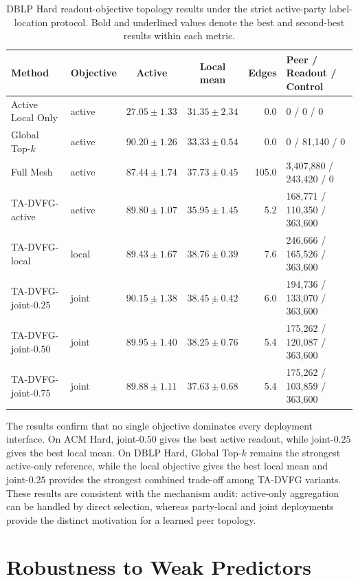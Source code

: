 \documentclass[letterpaper]{article}
\newcommand{\method}{\textsc{TA-DVFG}}
\begin{document}
\begin{table}[!t]
\centering
\scriptsize
\setlength{\tabcolsep}{3pt}
\caption{DBLP Hard readout-objective topology results under the strict
active-party label-location protocol. Bold and underlined values denote the best
and second-best results within each metric.}
\label{tab:supp-objective-dblp}
\begin{tabular}{llccrl}
\toprule
Method & Objective & Active & Local mean & Edges & Peer / Readout / Control \\
\midrule
Active Local Only & active & $27.05\pm1.33$ & $31.35\pm2.34$ & 0.0 & 0 / 0 / 0 \\
Global Top-$k$ & active & $\mathbf{90.20\pm1.26}$ & $33.33\pm0.54$ & 0.0 & 0 / 81,140 / 0 \\
Full Mesh & active & $87.44\pm1.74$ & $37.73\pm0.45$ & 105.0 & 3,407,880 / 243,420 / 0 \\
\method{}-active & active & $89.80\pm1.07$ & $35.95\pm1.45$ & 5.2 & 168,771 / 110,350 / 363,600 \\
\method{}-local & local & $89.43\pm1.67$ & $\mathbf{38.76\pm0.39}$ & 7.6 & 246,666 / 165,526 / 363,600 \\
\method{}-joint-$0.25$ & joint & $\underline{90.15\pm1.38}$ & $\underline{38.45\pm0.42}$ & 6.0 & 194,736 / 133,070 / 363,600 \\
\method{}-joint-$0.50$ & joint & $89.95\pm1.40$ & $38.25\pm0.76$ & 5.4 & 175,262 / 120,087 / 363,600 \\
\method{}-joint-$0.75$ & joint & $89.88\pm1.11$ & $37.63\pm0.68$ & 5.4 & 175,262 / 103,859 / 363,600 \\
\bottomrule
\end{tabular}
\end{table}

The results confirm that no single objective dominates every deployment
interface. On ACM Hard, joint-$0.50$ gives the best active readout, while
joint-$0.25$ gives the best local mean. On DBLP Hard, Global Top-$k$ remains
the strongest active-only reference, while the local objective gives the best
local mean and joint-$0.25$ provides the strongest combined trade-off among
\method{} variants. These results are consistent with the mechanism audit:
active-only aggregation can be handled by direct selection, whereas party-local
and joint deployments provide the distinct motivation for a learned peer
topology.

\section{Robustness to Weak Predictors}
\end{document}
